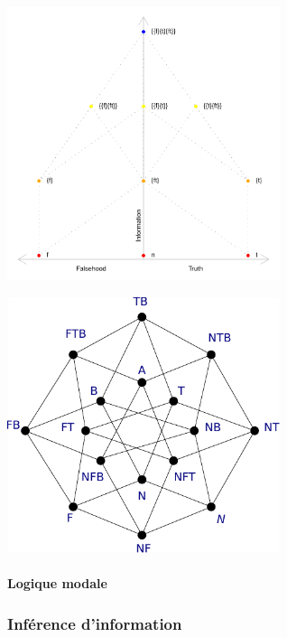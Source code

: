 \begin{refsegment}
    
    \begin{shadedfigure}
        \centering
        \includegraphics[width=0.6\textwidth]{img/seven_genralized_truth_values.pdf}
        \caption{  }
        \label{fig:seven_truth_values}
    \end{shadedfigure}

    \begin{shadedfigure}
        \centering
        \includegraphics[width=0.6\textwidth]{img/Generalized_Truth_Values_and_Multilattices.pdf}
        \caption{  }
        \label{fig:sixteen_truth_values}
    \end{shadedfigure}

    \paragraph{Logique modale}
    
    \subsubsection{Inférence d’information}

\end{refsegment}
